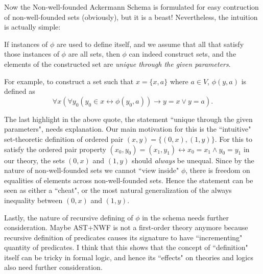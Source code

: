 \documentclass{article}
\begin{document}
Now the Non-well-founded Ackermann Schema is formulated for easy contruction of non-well-founded sets (obviously), but it is a beast! Nevertheless, the intuition is actually simple:

\begin{displayquote}
If instances of $\phi$ are used to define itself, and we assume that all that satisfy those instances of $\phi$ are all sets, then $\phi$ can indeed construct sets, and the elements of the constructed set are \textit{unique through the given parameters}.
\end{displayquote}

For example, to construct a set such that $x=\{x, a\}$ where $a \in V$, $\phi(y, a)$ is defined as $$\forall x (\forall y_0 (y_0 \in x \leftrightarrow \phi(y_0, a)) \rightarrow y = x \vee y = a).$$

The last highlight in the above quote, the statement ``unique through the given parameters", needs explanation. Our main motivation for this is the ``intuitive" set-theoretic definition of ordered pair $(x,y) = \{(0,x), (1, y)\}$. For this to satisfy the ordered pair property $(x_0,y_0) = (x_1, y_1) \leftrightarrow x_0 = x_1 \wedge y_0 = y_1$ in our theory, the sets $(0,x)$ and $(1,y)$ should \textit{always} be unequal. Since by the nature of non-well-founded sets we cannot ``view inside" $\phi$, there is freedom on equalities of elements across non-well-founded sets. Hence the statement can be seen as either a ``cheat", or the most natural generalization of the always inequality between $(0,x)$ and $(1,y)$.

Lastly, the nature of recursive defining of $\phi$ in the schema needs further consideration. Maybe \textsf{AST+NWF} is not a first-order theory anymore because recursive definition of predicates causes its signature to have ``incrementing" quantity of predicates. I think that this shows that the concept of ``definition" itself can be tricky in formal logic, and hence its ``effects" on theories and logics also need further consideration.



\end{document}
